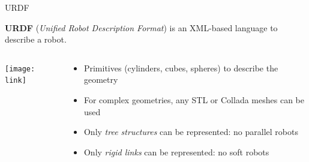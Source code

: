 \documentclass[compress]{beamer}
\begin{document}
\begin{frame}{URDF}

        \textbf{URDF} (\emph{Unified Robot Description Format}) is an XML-based language
        to describe a robot.

        \begin{columns}
            \begin{column}{0.5\linewidth}
        \begin{center}
            \texttt{[image: link]}
        \end{center}
                
            \end{column}
            \begin{column}{0.5\linewidth}
        \begin{itemize}
                \small
            \item Primitives (cylinders, cubes, spheres) to describe the
                geometry
            \item For complex geometries, any STL or Collada meshes can be used
            \item Only \emph{tree structures} can be represented: no parallel robots
            \item Only \emph{rigid links} can be represented: no soft robots
        \end{itemize}
            \end{column}
        \end{columns}
\end{frame}
\end{document}

